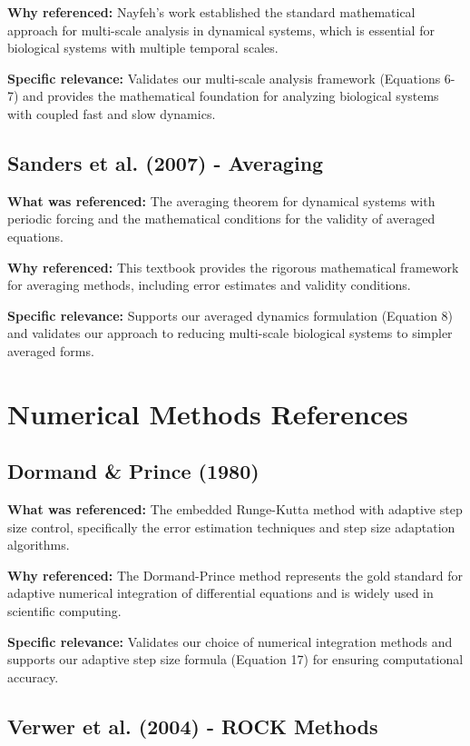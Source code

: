 \documentclass{article}
\begin{document}
\textbf{Why referenced:} Nayfeh's work established the standard mathematical approach for multi-scale analysis in dynamical systems, which is essential for biological systems with multiple temporal scales.

\textbf{Specific relevance:} Validates our multi-scale analysis framework (Equations 6-7) and provides the mathematical foundation for analyzing biological systems with coupled fast and slow dynamics.

\subsection{Sanders et al. (2007) - Averaging}

\textbf{What was referenced:} The averaging theorem for dynamical systems with periodic forcing and the mathematical conditions for the validity of averaged equations.

\textbf{Why referenced:} This textbook provides the rigorous mathematical framework for averaging methods, including error estimates and validity conditions.

\textbf{Specific relevance:} Supports our averaged dynamics formulation (Equation 8) and validates our approach to reducing multi-scale biological systems to simpler averaged forms.

\section{Numerical Methods References}

\subsection{Dormand \& Prince (1980)}

\textbf{What was referenced:} The embedded Runge-Kutta method with adaptive step size control, specifically the error estimation techniques and step size adaptation algorithms.

\textbf{Why referenced:} The Dormand-Prince method represents the gold standard for adaptive numerical integration of differential equations and is widely used in scientific computing.

\textbf{Specific relevance:} Validates our choice of numerical integration methods and supports our adaptive step size formula (Equation 17) for ensuring computational accuracy.

\subsection{Verwer et al. (2004) - ROCK Methods}
\end{document}
